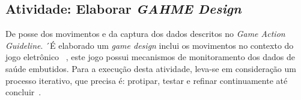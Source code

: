 


\subsection{Atividade: Elaborar \textit{GAHME Design}}
De posse dos movimentos e da captura dos dados descritos no \textit{Game Action Guideline}. ´É elaborado um \textit{game design} inclui os movimentos no contexto do jogo eletrônico ~\cite{sweetser2005-gameflow}, este jogo possui mecanismos de monitoramento dos dados de saúde embutidos. Para a execução desta atividade, leva-se em consideração um processo iterativo, que precisa é: protipar, testar e refinar continuamente até concluir~\cite{brathwaite2009challenges}.



%
%


